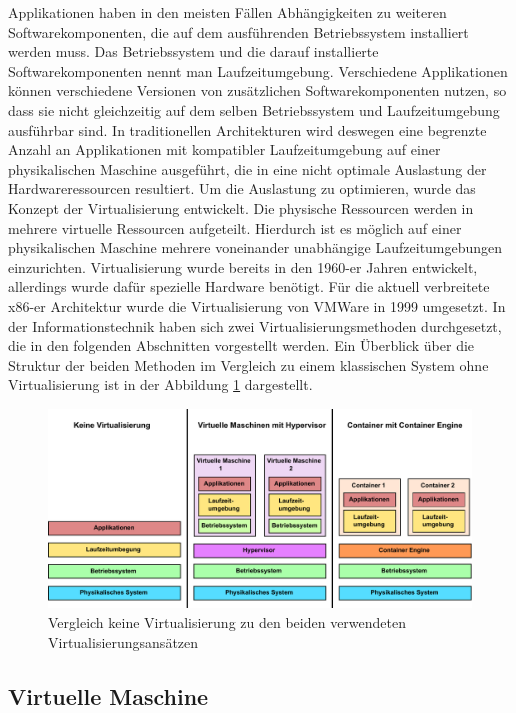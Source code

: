 Applikationen haben in den meisten Fällen Abhängigkeiten zu weiteren Softwarekomponenten, die auf dem ausführenden Betriebssystem installiert werden muss. Das Betriebssystem und die darauf installierte Softwarekomponenten nennt man Laufzeitumgebung. Verschiedene Applikationen können verschiedene Versionen von zusätzlichen Softwarekomponenten nutzen, so dass sie nicht gleichzeitig auf dem selben Betriebssystem und Laufzeitumgebung ausführbar sind. In traditionellen Architekturen wird deswegen eine begrenzte Anzahl an Applikationen mit kompatibler Laufzeitumgebung auf einer physikalischen Maschine ausgeführt, die in eine nicht optimale Auslastung der Hardwareressourcen resultiert. Um die Auslastung zu optimieren, wurde das Konzept der Virtualisierung entwickelt. Die physische Ressourcen werden in mehrere virtuelle Ressourcen aufgeteilt. Hierdurch ist es möglich auf einer physikalischen Maschine mehrere voneinander unabhängige Laufzeitumgebungen einzurichten. Virtualisierung wurde bereits in den 1960-er Jahren entwickelt, allerdings wurde dafür spezielle Hardware benötigt. Für die aktuell verbreitete x86-er Architektur wurde die Virtualisierung von VMWare in 1999 umgesetzt. \cite{Bugnion2012} In der Informationstechnik haben sich zwei Virtualisierungsmethoden durchgesetzt, die in den folgenden Abschnitten vorgestellt werden. Ein Überblick über die Struktur der beiden Methoden im Vergleich zu einem klassischen System ohne Virtualisierung ist in der Abbildung \ref{virtualisierung_optionen} dargestellt. 

\begin{figure}
	\centering
	\includegraphics[width=\textwidth]{./content/graphics/applikation_management.pdf}
	\caption{Vergleich keine Virtualisierung zu den beiden verwendeten Virtualisierungsansätzen}
	\label{virtualisierung_optionen}
\end{figure}

\subsection{Virtuelle Maschine}

